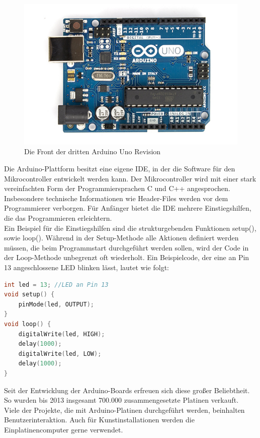 \begin{figure}[H] 
	\centering
	\includegraphics[scale=0.6]{Bilder/arduinouno}
	\caption{Die Front der dritten Arduino Uno Revision\cite{i:arduinouno}}
	\label{f:arduinouno}
\end{figure}

Die Arduino-Plattform besitzt eine eigene \ac{IDE}, in der die Software für den Mikrocontroller entwickelt werden kann. Der Mikrocontroller wird mit einer stark vereinfachten Form der Programmiersprachen C und C++ angesprochen. Insbesondere technische Informationen wie Header-Files werden vor dem Programmierer verborgen. Für Anfänger bietet die \ac{IDE} mehrere Einstiegshilfen, die das Programmieren erleichtern.\\
Ein Beispiel für die Einstiegshilfen sind die strukturgebenden Funktionen setup(), sowie loop(). Während in der Setup-Methode alle Aktionen definiert werden müssen, die beim Programmstart durchgeführt werden sollen, wird der Code in der Loop-Methode unbegrenzt oft wiederholt.
Ein Beispielcode, der eine an Pin 13 angeschlossene LED blinken lässt, lautet wie folgt:\\

\begin{lstlisting}[language=c,caption={Simpler Arduino-Code, der eine LED blinken lässt},label=lst:blink,frame=single] 
int led = 13; //LED an Pin 13
void setup() {                
	pinMode(led, OUTPUT);     
}
void loop() {
	digitalWrite(led, HIGH);  
	delay(1000);               
	digitalWrite(led, LOW);   
	delay(1000);               
}
\end{lstlisting}

Seit der Entwicklung der Arduino-Boards erfreuen sich diese großer Beliebtheit. So wurden bis 2013 insgesamt 700.000 zusammengesetzte Platinen verkauft\cite{ws:sellnumb}.\\

Viele der Projekte, die mit Arduino-Platinen durchgeführt werden, beinhalten Benutzerinteraktion. Auch für Kunstinstallationen werden die Einplatinencomputer gerne verwendet\cite{ws:elektor}.
